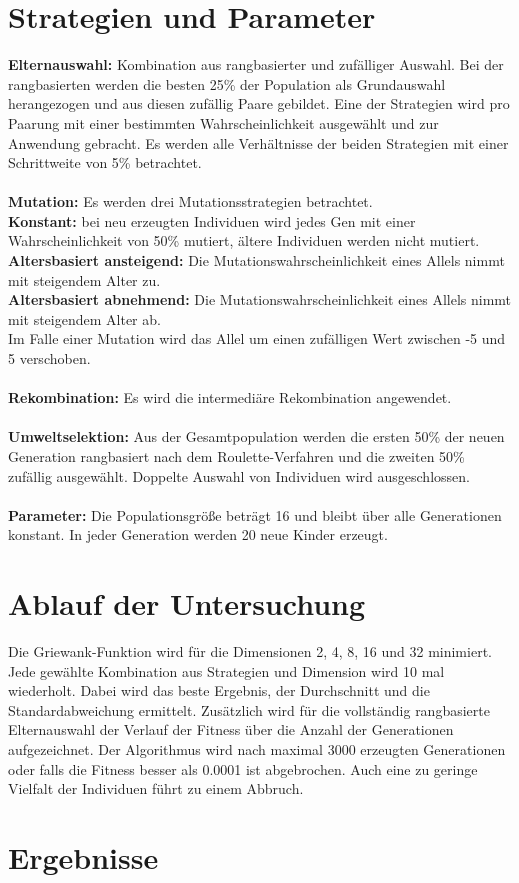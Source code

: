 \documentclass[12pt,
    a4paper,
    headinclude,
    footinclude]{scrartcl}
\begin{document}
	\section{Strategien und Parameter}

	\textbf{Elternauswahl:} Kombination aus rangbasierter und zufälliger Auswahl. Bei der rangbasierten werden die besten 25\% der Population als Grundauswahl herangezogen und aus diesen zufällig Paare gebildet.
	Eine der Strategien wird pro Paarung mit einer bestimmten Wahrscheinlichkeit ausgewählt und zur Anwendung gebracht. Es werden alle Verhältnisse der beiden Strategien mit einer Schrittweite von 5\% betrachtet. \\\\	
	\textbf{Mutation:} Es werden drei Mutationsstrategien betrachtet. \\
	\textbf{Konstant:} bei neu erzeugten Individuen wird jedes Gen mit einer Wahrscheinlichkeit von 50\% mutiert, ältere Individuen werden nicht mutiert.
	\textbf{Altersbasiert ansteigend:} Die Mutationswahrscheinlichkeit eines Allels nimmt mit steigendem Alter zu.\\
	\textbf{Altersbasiert abnehmend:} Die Mutationswahrscheinlichkeit eines Allels nimmt mit steigendem Alter ab. \\
	Im Falle einer Mutation wird das Allel um einen zufälligen Wert zwischen -5 und 5 verschoben. \\\\
	\textbf{Rekombination:} Es wird die intermediäre Rekombination angewendet.\\\\
	\textbf{Umweltselektion:} Aus der Gesamtpopulation werden die ersten 50\% der neuen Generation rangbasiert nach dem Roulette-Verfahren und die zweiten 50\% zufällig ausgewählt. Doppelte Auswahl von Individuen wird ausgeschlossen.\\\\
	\textbf{Parameter:} Die Populationsgröße beträgt 16 und bleibt über alle Generationen konstant. In jeder Generation werden 20 neue Kinder erzeugt.
	
	\section{Ablauf der Untersuchung}
	Die Griewank-Funktion wird für die Dimensionen 2, 4, 8, 16 und 32 minimiert. Jede gewählte Kombination aus Strategien und Dimension wird 10 mal wiederholt. Dabei wird das beste Ergebnis, der Durchschnitt und die Standardabweichung ermittelt. Zusätzlich wird für die vollständig rangbasierte Elternauswahl der Verlauf der Fitness über die Anzahl der Generationen aufgezeichnet. Der Algorithmus wird nach maximal 3000 erzeugten Generationen oder falls die Fitness besser als 0.0001 ist abgebrochen. Auch eine zu geringe Vielfalt der Individuen führt zu einem Abbruch.



	\section{Ergebnisse}
	\blindtext[5]
\end{document}
